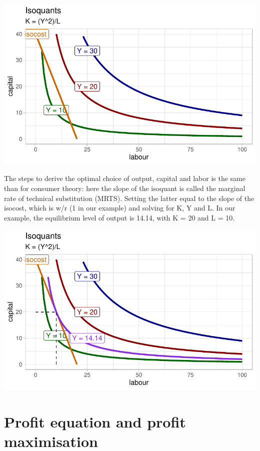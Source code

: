 \documentclass[
  letterpaper,
  DIV=11,
  numbers=noendperiod]{scrreprt}
\begin{document}
\includegraphics{production-theory_files/figure-pdf/unnamed-chunk-10-1.pdf}

The steps to derive the optimal choice of output, capital and labor is
the same than for consumer theory: here the slope of the isoquant is
called the marginal rate of technical substitution (MRTS). Setting the
latter equal to the slope of the isocost, which is w/r (1 in our
example) and solving for K, Y and L. In our example, the equilibrium
level of output is 14.14, with K = 20 and L = 10.

\includegraphics{production-theory_files/figure-pdf/unnamed-chunk-11-1.pdf}

\hypertarget{profit-equation-and-profit-maximisation}{%
\section{Profit equation and profit
maximisation}\label{profit-equation-and-profit-maximisation}}
\end{document}
